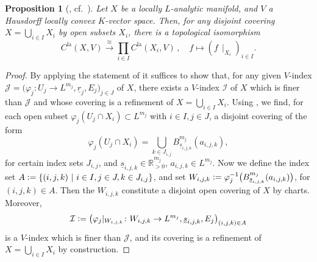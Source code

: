 \documentclass[a4paper, reqno, 10pt]{amsart}
\newtheorem{proposition}[theorem]{Proposition}
\theoremstyle{definition}
\numberwithin{equation}{section}
\newcommand{\defeq}{\vcentcolon=}
\newcommand{\id}{{\mathrm{id}}}
\newcommand{\la}{{\mathrm{la}}}
\newcommand{\lra}{\longrightarrow}
\newcommand{\lto}{\longmapsto}
\newcommand{\ra}{\rightarrow}
\newcommand{\res}[1]{{\!\,\mid_{#1}}}
\newcommand{\ul}[1]{{\underline{#1}}}
\let\originalmiddle\middle
\renewcommand{\middle}[1]{\,\originalmiddle#1\,}
\newcommand{\BR}{{\mathbb {R}}}
\newcommand{\CI}{{\mathcal {I}}}
\newcommand{\CJ}{{\mathcal {J}}}
\begin{document}
\begin{proposition}[{\cite[Kor.\ 2.2.4]{FeauxdeLacroix99TopDarstpAdischLieGrp}, cf.\ \cite[Prop.\ 12.5]{Schneider11pAdicLieGrps}}]\label{Prop 1 - Disjoint coverings and locally analytic functions}
	Let $X$ be a locally $L$-analytic manifold, and $V$ a Hausdorff locally convex $K$-vector space.
	Then, for any disjoint covering $X = \bigcup_{i\in I} X_i$ by open subsets $X_i$, there is a topological isomorphism
	\begin{equation*}
		C^\la(X,V) \overset{\cong}{\lra} \prod_{i\in I} C^\la(X_i , V) \,,\quad f \lto (f\res{X_i})_{i\in I} .
	\end{equation*}
\end{proposition}
\begin{proof}
	By applying the statement of \cite[Lemma 11.7]{Schneider11pAdicLieGrps} it suffices to show that, for any given $V$-index \mbox{$\CJ = \big(\varphi_j\colon U_j \ra L^{m_j}, \ul{r}_j, E_j\big)_{j\in J}$} of $X$, there exists a $V$-index $\CI$ of $X$ which is finer than $\CJ$ and whose covering is a refinement of $X= \bigcup_{i\in I} X_i$.
	Using \cite[Lemma 1.4]{Schneider11pAdicLieGrps}, we find, for each open subset $\varphi_j(U_j \cap X_i) \subset L^{m_j}$ with $i\in I, j\in J$, a disjoint covering of the form
	\begin{equation*}
		\varphi_j(U_j \cap X_i) = \bigcup_{k\in J_{i,j}} B^{m_j}_{\ul{s}_{i,j,k}}(a_{i,j,k}) ,
	\end{equation*}
	for certain index sets $J_{i,j}$, and $\ul{s}_{i,j,k}\in \BR_{>0}^{m_j}$, $a_{i,j,k} \in L^{m_j}$.
	Now we define the index set $A \defeq \left\{ (i,j,k)\middle{|} i\in I, j\in J, k\in J_{i,j}\right\}$, and set $W_{i,j,k} \defeq \varphi_j^{-1} \big(B^{m_j}_{\ul{s}_{i,j,k}}(a_{i,j,k})\big)$, for $(i,j,k)\in A$.
	Then the $W_{i,j,k}$ constitute a disjoint open covering of $X$ by charts.
	Moreover, 
	\begin{equation*}
		\CI \defeq  \big( \varphi_j\res{W_{i,j,k}} \colon W_{i,j,k} \ra L^{m_j}, \ul{s}_{i,j,k}, E_j \big)_{(i,j,k)\in A} 
	\end{equation*}
	is a $V$-index which is finer than $\CJ$,
	and its covering is a refinement of $X= \bigcup_{i\in I} X_i$ by construction.
\end{proof}
\end{document}
